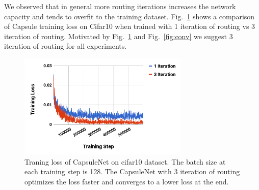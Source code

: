 \documentclass{article}
\begin{document}
We observed that in general more routing iterations increases the network capacity and tends to overfit to the training dataset. Fig.~\ref{fig:cifar} shows a comparison of Capsule training loss on Cifar10 when trained with 1 iteration of routing vs $3$ iteration of routing. Motivated by Fig.~\ref{fig:cifar} and Fig.~\ref{fig:conv} we suggest 3 iteration of routing for all experiments.
\begin{figure}[h]
\caption{Traning loss of CapsuleNet on cifar10 dataset. The batch size at each training step is 128. The CapsuleNet with 3 iteration of routing optimizes the loss faster and converges to a lower loss at the end.}
\label{fig:cifar}
\centering
\includegraphics[height=5cm]{cifar}
\end{figure}
\end{document}
